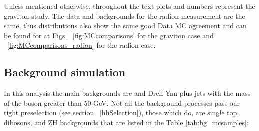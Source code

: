 Unless mentioned otherwise, throughout the text plots and numbers represent the graviton study. The data and backgrounds for the radion measurement are the same, thus distributions also show the same good Data MC agreement and can be found for at Figs. ~\ref{fig:MCcomparisons} for the graviton case and ~\ref{fig:MCcomparisons_radion} for the radion case.

\subsection{Background simulation\label{sec:bkgMC}}

In this analysis the main backgrounds are \ttbar and Drell-Yan plus
jets with the mass of the boson greater than 50 GeV. Not all the
background processes pass our tight preselection (see section ~\ref{hhSelection}),
those which do, are single top, dibosons, and ZH backgrounds that are
listed in the Table \ref{tab:bg_mcsamples}:

